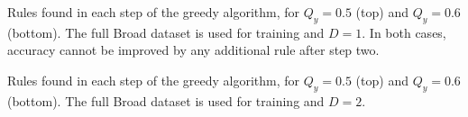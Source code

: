 %

\begin{table}
    \centering
    \vspace{1em}
    \caption{Rules found in each step of the greedy algorithm, for $Q_y=0.5$ (top) and $Q_y=0.6$ (bottom).
    The full Broad dataset is used for training and $D=1$.
    In both cases, accuracy cannot be improved by any additional rule after step two.}
    \label{tab:greedy_yq_4_5_mw_0_C_3_D_1}
\end{table}

\begin{table}
    \centering
    \vspace{1em}
    \caption{Rules found in each step of the greedy algorithm, for $Q_y=0.5$ (top) and $Q_y=0.6$ (bottom).
    The full Broad dataset is used for training and $D=2$.}
    \label{tab:greedy_yq_4_5_mw_0_C_3_D_2}
\end{table}



